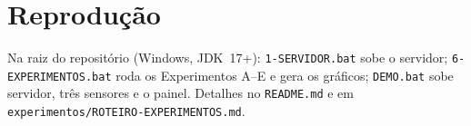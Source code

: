 \documentclass[conference]{IEEEtran}
\begin{document}
\section{Reprodução}
Na raiz do repositório (Windows, JDK~17+): \texttt{1-SERVIDOR.bat} sobe o servidor; \texttt{6-EXPERIMENTOS.bat} roda os Experimentos A--E e gera os gráficos; \texttt{DEMO.bat} sobe servidor, três sensores e o painel. Detalhes no \texttt{README.md} e em \texttt{experimentos/ROTEIRO-EXPERIMENTOS.md}.
\end{document}
